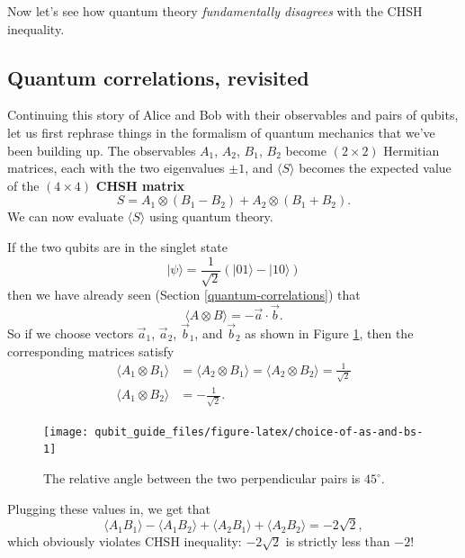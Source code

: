 \documentclass[fleqn,a4paper]{article}
\renewcommand{\footnote}[1]{\sidenotetext[{\color{white}0}\!\!]{\footnotesize #1}}
\theoremstyle{definition}
\theoremstyle{definition}
\theoremstyle{definition}
\theoremstyle{definition}
\theoremstyle{remark}
\begin{document}
Now let's see how quantum theory \emph{fundamentally disagrees} with the CHSH inequality.

\hypertarget{quantum-correlations-revisited}{%
\subsection{Quantum correlations, revisited}\label{quantum-correlations-revisited}}

Continuing this story of Alice and Bob with their observables and pairs of qubits, let us first rephrase things in the formalism of quantum mechanics that we've been building up.
The observables \(A_1\), \(A_2\), \(B_1\), \(B_2\) become \((2\times 2)\) Hermitian matrices, each with the two eigenvalues \(\pm 1\), and \(\langle S\rangle\) becomes the expected value of the \((4\times 4)\) \textbf{CHSH matrix}
\[
  S = A_1\otimes(B_1-B_2) + A_2\otimes(B_1+B_2).
\]
We can now evaluate \(\langle S\rangle\) using quantum theory.

If the two qubits are in the singlet state
\[
  |\psi\rangle
  = \frac{1}{\sqrt{2}} \left( |01\rangle-|10\rangle \right)
\]
then we have already seen (Section \ref{quantum-correlations}) that
\[
  \langle A\otimes B\rangle = -\vec{a}\cdot\vec{b}.
\]
So if we choose vectors \(\vec{a}_1\), \(\vec{a}_2\), \(\vec{b}_1\), and \(\vec{b}_2\) as shown in Figure \ref{fig:choice-of-as-and-bs}, then the corresponding matrices\footnote{That is, \(A_1=\vec{a}_1\cdot\vec{\sigma}\), and so on.} satisfy
\[
\begin{aligned}
  \langle A_1\otimes B_1\rangle
  &= \langle A_2\otimes B_1\rangle
  = \langle A_2\otimes B_2\rangle
  = \frac{1}{\sqrt{2}}
\\\langle A_1\otimes B_2\rangle
  &= -\frac{1}{\sqrt{2}}.
\end{aligned}
\]



\begin{figure}[H]

{\centering \texttt{[image: qubit\_guide\_files/figure-latex/choice-of-as-and-bs-1]} 

}

\caption{The relative angle between the two perpendicular pairs is \(45^\circ\).}\label{fig:choice-of-as-and-bs}
\end{figure}

Plugging these values in, we get that
\[
  \langle A_1 B_1\rangle - \langle A_1 B_2\rangle + \langle A_2 B_1\rangle + \langle A_2 B_2\rangle
  = -2\sqrt{2},
\]
which obviously violates CHSH inequality: \(-2\sqrt{2}\) is strictly less than \(-2\)!
\end{document}
